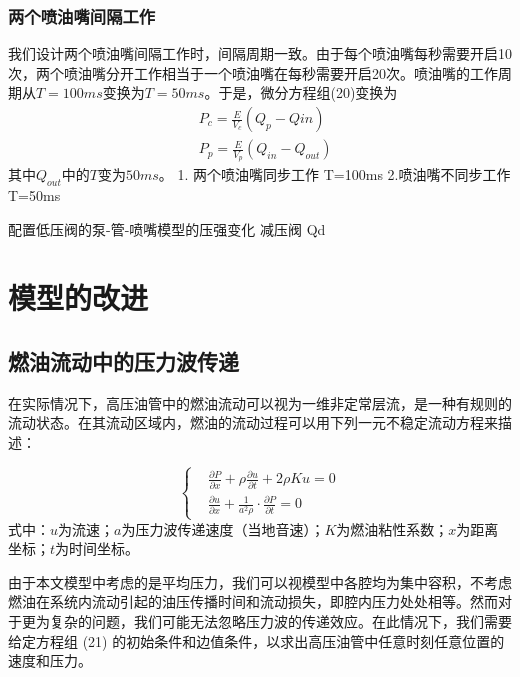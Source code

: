 \documentclass[withoutpreface,bwprint]{cumcmthesis} %
\begin{document}
			\subsubsection{两个喷油嘴间隔工作}
			我们设计两个喷油嘴间隔工作时，间隔周期一致。由于每个喷油嘴每秒需要开启10次，两个喷油嘴分开工作相当于一个喷油嘴在每秒需要开启20次。喷油嘴的工作周期从$T = 100ms$变换为$T = 50ms$。于是，微分方程组(20)变换为
			\begin{equation}
			\begin{aligned}
			&P_c=\frac{E}{V_c}(Q_p-Q{in}) \\
			&P_p=\frac{E}{V_p}(Q_{in}-Q_{out})
			\end{aligned}
			\end{equation}
			其中$Q_{out}$中的$T$变为$50ms$。
			1. 两个喷油嘴同步工作
			T=100ms
			2.喷油嘴不同步工作
			T=50ms
			
			配置低压阀的泵­-管-­喷嘴模型的压强变化
			减压阀
			Qd
			
			\section{模型的改进}
			
			\subsection{燃油流动中的压力波传递}
			
			在实际情况下，高压油管中的燃油流动可以视为一维非定常层流，是一种有规则的流动状态。在其流动区域内，燃油的流动过程可以用下列一元不稳定流动方程\cite{bib:five}来描述：
			
			\begin{equation}
			\left\{
			\begin{aligned}
			&\frac{\partial P}{\partial x} + \rho \frac{\partial u}{\partial t} + 2 \rho K u = 0 \\
			&\frac{\partial u}{\partial x} + \frac{1}{a^2 \rho} \cdot \frac{\partial P}{\partial t} = 0
			\end{aligned}
			\right.
			\end{equation}
			式中：$u$为流速；$a$为压力波传递速度（当地音速）；$K$为燃油粘性系数；$x$为距离坐标；$t$为时间坐标。
			
			由于本文模型中考虑的是平均压力，我们可以视模型中各腔均为集中容积，不考虑燃油在系统内流动引起的油压传播时间和流动损失，即腔内压力处处相等。然而对于更为复杂的问题，我们可能无法忽略压力波的传递效应。在此情况下，我们需要给定方程组 (21) 的初始条件和边值条件，以求出高压油管中任意时刻任意位置的速度和压力。
			
\end{document}
